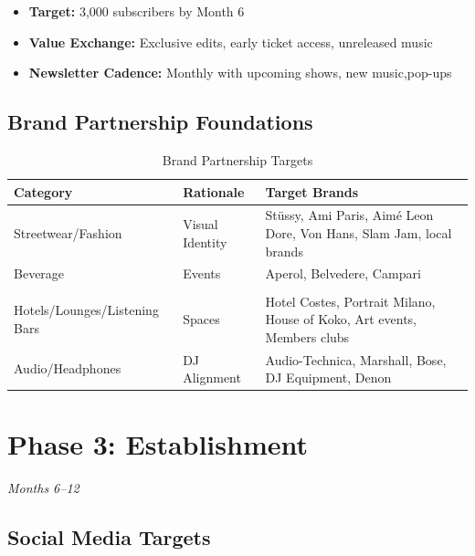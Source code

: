 \documentclass[11pt,a4paper]{article}
\begin{document}
\begin{itemize}[leftmargin=*]
    \item \textbf{Target:} 3,000 subscribers by Month 6
    \item \textbf{Value Exchange:} Exclusive edits, early ticket access, unreleased music
    \item \textbf{Newsletter Cadence:} Monthly with upcoming shows, new music,pop-ups
\end{itemize}

\subsection{Brand Partnership Foundations}

\begin{table}[h!]
\centering
\renewcommand{\arraystretch}{1.3}
\begin{tabularx}{\textwidth}{l l X}
\toprule
\rowcolor{amaraprimary}
\textcolor{amaracream}{\textbf{Category}} & \textcolor{amaracream}{\textbf{Rationale}} & \textcolor{amaracream}{\textbf{Target Brands}} \\
\midrule
Streetwear/Fashion & Visual Identity & Stüssy, Ami Paris, Aimé Leon Dore, Von Hans, Slam Jam, local brands \\
Beverage & Events & Aperol, Belvedere, Campari \\
\\
Hotels/Lounges/Listening Bars & Spaces & Hotel Costes, Portrait Milano, House of Koko, Art events, Members clubs \\
Audio/Headphones & DJ Alignment & Audio-Technica, Marshall, Bose, DJ Equipment, Denon \\
\bottomrule
\end{tabularx}
\caption{Brand Partnership Targets}
\end{table}

\newpage
\section{Phase 3: Establishment}
\textit{Months 6--12}

\subsection{Social Media Targets}
\end{document}
